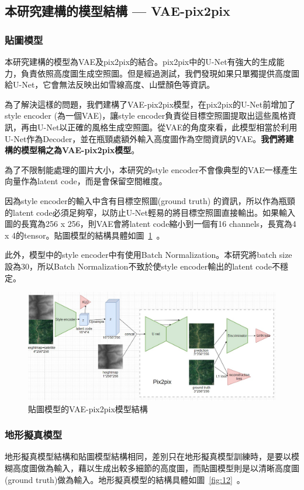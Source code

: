 \documentclass[a4paper, 12pt]{article}
\begin{document}
\subsection{本研究建構的模型結構 — VAE-pix2pix}
\label{sec:5}
\subsubsection{貼圖模型}
本研究建構的模型為VAE及pix2pix的結合。pix2pix中的U-Net有強大的生成能力，負責依照高度圖生成空照圖。但是經過測試，我們發現如果只單獨提供高度圖給U-Net，它會無法反映出如雪線高度、山壁顏色等資訊。

為了解決這樣的問題，我們建構了VAE-pix2pix模型，在pix2pix的U-Net前增加了style encoder (為一個VAE)，讓style encoder負責從目標空照圖提取出這些風格資訊，再由U-Net以正確的風格生成空照圖。從VAE的角度來看，此模型相當於利用U-Net作為Decoder，並在瓶頸處額外輸入高度圖作為空間資訊的VAE。\textbf{我們將建構的模型稱之為VAE-pix2pix模型}。

為了不限制能處理的圖片大小，本研究的style encoder不會像典型的VAE一樣產生向量作為latent code，而是會保留空間維度。

因為style encoder的輸入中含有目標空照圖(ground truth) 的資訊，所以作為瓶頸的latent code必須足夠窄，以防止U-Net輕易的將目標空照圖直接輸出。如果輸入圖的長寬為256 x 256，則VAE會將latent code縮小到一個有16 channels，長寬為4 x 4的tensor。貼圖模型的結構具體如圖~\ref{fig:11}~。

此外，模型中的style encoder中有使用Batch Normalization。本研究將batch size設為30，所以Batch Normalization不致於使style encoder輸出的latent code不穩定。

\begin{figure}[htbp]
    \centering
    \includegraphics[width=\linewidth]{fig/11.jpg}
    \caption{貼圖模型的VAE-pix2pix模型結構}
    \label{fig:11}
\end{figure}

\subsubsection{地形擬真模型}
地形擬真模型結構和貼圖模型結構相同，差別只在地形擬真模型訓練時，是要以模糊高度圖做為輸入，藉以生成出較多細節的高度圖，而貼圖模型則是以清晰高度圖(ground truth)做為輸入。地形擬真模型的結構具體如圖~\ref{fig:12}~。
\end{document}
